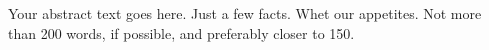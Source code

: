 \documentclass[../main.tex]{subfiles}
\begin{document}
Your abstract text goes here. Just a few facts. Whet our appetites.
Not more than 200 words, if possible, and preferably closer to 150.
\end{document}
